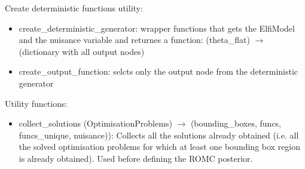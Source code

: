\documentclass{article}
\begin{document}
  Create deterministic functions utility:

  \begin{itemize}
    \item create\_deterministic\_generator: wrapper functions that gets the ElfiModel and the nuisance variable and returnes a function: (theta\_flat) $\rightarrow$ (dictionary with all output nodes)
    \item create\_output\_function: selcts only the output node from the deterministic generator      \end{itemize}
  

  Utility functions:

  \begin{itemize}
    \item collect\_solutions (OptimisationProblems) $\rightarrow$ (bounding\_boxes, funcs, funcs\_unique, nuisance)): Collects all the solutions already obtained (i.e. all the solved optimisation problems for which at least one bounding box region is already obtained). Used before defining the ROMC posterior.
    \end{itemize}
\end{document}
